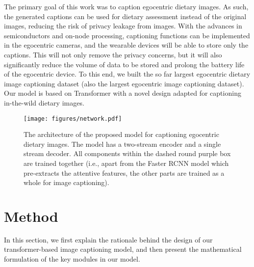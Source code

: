 \documentclass[journal]{IEEEtran}
\begin{document}
The primary goal of this work was to caption egocentric dietary images. As such, the generated captions can be used for dietary assessment instead of the original images, reducing the risk of privacy leakage from images. With the advances in semiconductors and on-node processing, captioning functions can be implemented in the egocentric cameras, and the wearable devices will be able to store only the captions. This will not only remove the privacy concerns, but it will also significantly reduce the volume of data to be stored and prolong the battery life of the egocentric device. To this end, we built the so far largest egocentric dietary image captioning dataset (also the largest egocentric image captioning dataset). Our model is based on Transformer with a novel design adapted for captioning in-the-wild dietary images. 





\begin{figure}[!t]
\centerline{\texttt{[image: figures/network.pdf]}}
\caption{The architecture of the proposed model for captioning egocentric dietary images. The model has a two-stream encoder and a single stream decoder. All components within the dashed round purple box are trained together (i.e., apart from the Faster RCNN model which pre-extracts the attentive features, the other parts are trained as a whole for image captioning).}
\label{fig:network}

\end{figure}



\section{Method}\label{sec:method}


In this section, we first explain the rationale behind the design of our transformer-based image captioning model, and then present the mathematical formulation of the key modules in our model.
\end{document}
